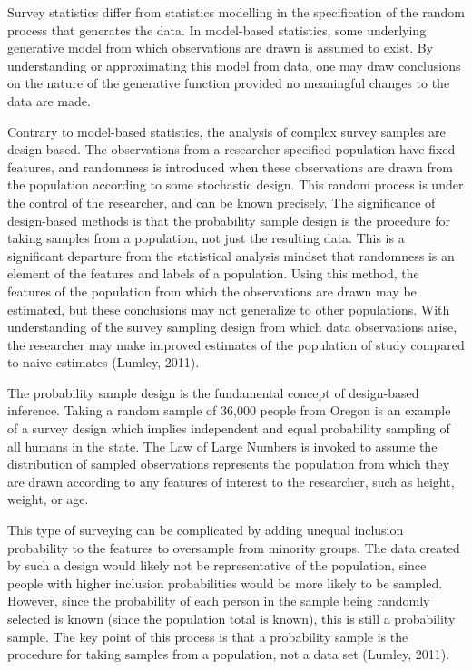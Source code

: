 \documentclass[12pt,twoside]{reedthesis}
\begin{document}
Survey statistics differ from statistics modelling in the specification
of the random process that generates the data. In model-based
statistics, some underlying generative model from which observations are
drawn is assumed to exist. By understanding or approximating this model
from data, one may draw conclusions on the nature of the generative
function provided no meaningful changes to the data are made.

Contrary to model-based statistics, the analysis of complex survey
samples are design based. The observations from a researcher-specified
population have fixed features, and randomness is introduced when these
observations are drawn from the population according to some stochastic
design. This random process is under the control of the researcher, and
can be known precisely. The significance of design-based methods is that
the probability sample design is the procedure for taking samples from a
population, not just the resulting data. This is a significant departure
from the statistical analysis mindset that randomness is an element of
the features and labels of a population. Using this method, the features
of the population from which the observations are drawn may be
estimated, but these conclusions may not generalize to other
populations. With understanding of the survey sampling design from which
data observations arise, the researcher may make improved estimates of
the population of study compared to naive estimates (Lumley, 2011).

The probability sample design is the fundamental concept of design-based
inference. Taking a random sample of 36,000 people from Oregon is an
example of a survey design which implies independent and equal
probability sampling of all humans in the state. The Law of Large
Numbers is invoked to assume the distribution of sampled observations
represents the population from which they are drawn according to any
features of interest to the researcher, such as height, weight, or age.

This type of surveying can be complicated by adding unequal inclusion
probability to the features to oversample from minority groups. The data
created by such a design would likely not be representative of the
population, since people with higher inclusion probabilities would be
more likely to be sampled. However, since the probability of each person
in the sample being randomly selected is known (since the population
total is known), this is still a probability sample. The key point of
this process is that a probability sample is the procedure for taking
samples from a population, not a data set (Lumley, 2011).
\end{document}
